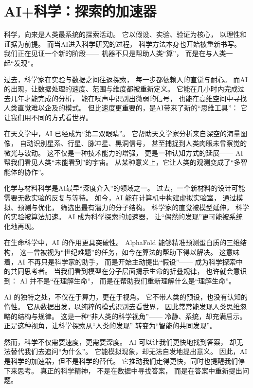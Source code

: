 \section{AI+科学：探索的加速器}

科学，向来是人类最系统的探索活动。  
它以假设、实验、验证为核心，  
以理性和证据为前提。  
而当AI进入科学研究的过程，  
科学方法本身也开始被重新书写。  
我们正在见证一个新的阶段——  
机器不只是帮助人类“算”，  
而是在与人类一起“发现”。

过去，科学家在实验与数据之间往返探索，  
每一步都依赖人的直觉与耐心。  
而AI的出现，让数据处理的速度、范围与维度都被重新定义。  
它能在几小时内完成过去几年才能完成的分析，  
能在噪声中识别出微弱的信号，  
也能在高维空间中寻找人类直觉难以企及的模式。  
但比速度更重要的，是AI带来了新的“思维工具”：  
它让我们用不同的方式看世界。

在天文学中，AI 已经成为“第二双眼睛”。  
它帮助天文学家分析来自深空的海量图像，  
自动识别星系、行星、脉冲星、黑洞信号，  
甚至捕捉到人类肉眼未曾察觉的微光与波动。  
这不仅是一种技术能力的增强，  
更是一种认知方式的延展——  
AI 帮我们看见人类“未能看到”的宇宙。  
从某种意义上，它让人类的观测变成了“多智能体的协作”。

化学与材料科学是AI最早“深度介入”的领域之一。  
过去，一个新材料的设计可能需要无数实验的反复与等待。  
如今，AI 能在计算机中构建虚拟实验室，  
通过模拟、预测与优化，  
筛选出最有潜力的分子结构。  
科学家的直觉被模型延伸，  
科学的实验被算法加速。  
AI 成为科学探索的加速器，  
让“偶然的发现”更可能被系统化地再现。

在生命科学中，AI 的作用更具突破性。  
AlphaFold 能够精准预测蛋白质的三维结构，  
这一曾被视为“世纪难题”的任务，如今在算法的帮助下得以解决。  
这意味着，AI 不再只是科学家的助手，  
而是开始主动提出“假设”——  
成为科学探索中的共同思考者。  
当我们看到模型在分子层面揭示生命的折叠规律，  
也许就会意识到：  
AI 并不是“在理解生命”，  
而是在帮助我们重新理解什么是“理解生命”。

AI 的独特之处，不仅在于算力，更在于视角。  
它不带人类的预设，也没有认知的惰性。  
它从数据出发，以纯粹的模式识别去看世界，  
因此常常能发现人类思维忽略的结构与规律。  
这是一种“非人类的科学视角”——  
冷静、系统，却充满启示。  
正是这种视角，让科学探索从“人类的发现”  
转变为“智能的共同发现”。

然而，科学不仅需要速度，更需要深度。  
AI 可以让我们更快地找到答案，  
却无法替代我们去追问“为什么”。  
它能模拟现象，却无法自发地提出意义。  
因此，AI 是科学的加速器，但不是科学的替代。  
它推动我们走得更快，同时也提醒我们停下来思考。  
真正的科学精神，  
不是在数据中寻找答案，  
而是在答案中重新提出问题。

